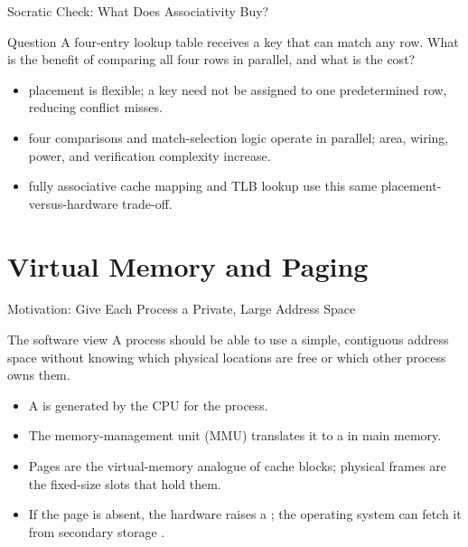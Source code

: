 \documentclass[aspectratio=169]{beamer}
\begin{document}
\begin{frame}{Socratic Check: What Does Associativity Buy?}
  \begin{alertblock}{Question}
    A four-entry lookup table receives a key that can match any row. What is
    the benefit of comparing all four rows in parallel, and what is the cost?
  \end{alertblock}
  \begin{itemize}
    \item {} placement is flexible; a key need not be assigned to
      one predetermined row, reducing conflict misses.
    \item {} four comparisons and match-selection logic operate in
      parallel; area, wiring, power, and verification complexity increase.
    \item {} fully associative cache mapping and TLB lookup use
      this same placement-versus-hardware trade-off.
  \end{itemize}
\end{frame}


\section{Virtual Memory and Paging}

\begin{frame}{Motivation: Give Each Process a Private, Large Address Space}
  \begin{block}{The software view}
    A process should be able to use a simple, contiguous address space without
    knowing which physical locations are free or which other process owns them.
  \end{block}
  \begin{itemize}
    \item A  is generated by the CPU for the process.
    \item The memory-management unit (MMU) translates it to a  in main memory.
    \item Pages are the virtual-memory analogue of cache blocks; physical
      frames are the fixed-size slots that hold them.
    \item If the page is absent, the hardware raises a ; the
      operating system can fetch it from secondary storage
      \cite[\S5.7, p.~441]{PattersonHennessy2017_computer_organization_design}.
  \end{itemize}
\end{frame}
\end{document}
